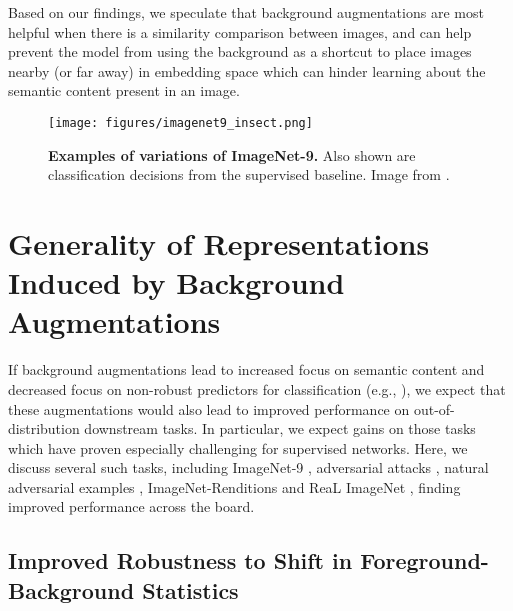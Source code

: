 \documentclass[twoside,11pt]{article}
\begin{document}
Based on our findings, we speculate that background augmentations are most helpful when there is a similarity comparison between images, and can help prevent the model from using the background as a shortcut to place images nearby (or far away) in embedding space which can hinder learning about the semantic content present in an image. 


\begin{figure}
    \centering
    \texttt{[image: figures/imagenet9\_insect.png]}
    \caption{\textbf{Examples of variations of ImageNet-9.} Also shown are classification decisions from the supervised baseline. Image from \citet{xiao2020noise}. }
    \label{fig:bg_chall_example}
\end{figure}


\section{Generality of Representations Induced by Background Augmentations}
If background augmentations lead to increased focus on semantic content and decreased focus on non-robust predictors for classification (e.g., \citet{ilyas_neurips_2020_features_not_bugs}), we expect that these augmentations would also lead to improved performance on out-of-distribution downstream tasks. In particular, we expect gains on those tasks which have proven especially challenging for supervised networks. Here, we discuss several such tasks, including ImageNet-9 \citep{xiao2020noise}, adversarial attacks \citep{goodfellow_fgsm, kurakin_adversarial_2016, madry2018towards}, natural adversarial examples \citep{hendrycks2019nae}, ImageNet-Renditions \citep{hendrycks_many_2021} and ReaL ImageNet \citep{beyer2020imagenetreal}, finding improved performance across the board. 


\subsection{Improved Robustness to Shift in Foreground-Background Statistics}
\label{sec:bg_challenge}
\end{document}
